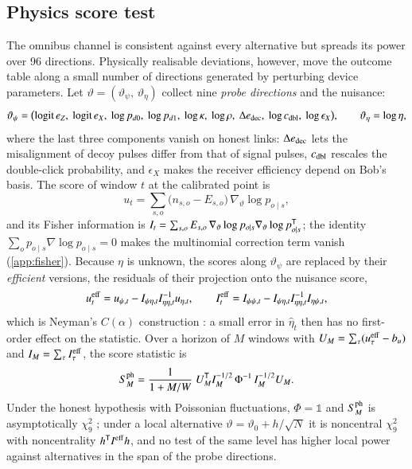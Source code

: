 \subsection{Physics score test}\label{sec:score}

The omnibus channel is consistent against every alternative but spreads its power over 96 directions. Physically realisable deviations, however, move the outcome table along a small number of directions generated by perturbing device parameters. Let $\vartheta=(\vartheta_\psi,\,\vartheta_\eta)$ collect nine \emph{probe directions} and the nuisance:
\begin{equation}
\vartheta_\psi = \bigl(\mathrm{logit}\,e_Z,\ \mathrm{logit}\,e_X,\ \log p_{d0},\ \log p_{d1},\ \log\kappa,\ \log\rho,\ \Delta e_{\rm dec},\ \log c_{\rm dbl},\ \log\epsilon_X\bigr),\qquad \vartheta_\eta=\log\eta, \label{eq:directions}
\end{equation}
where the last three components vanish on honest links: $\Delta e_{\rm dec}$ lets the misalignment of decoy pulses differ from that of signal pulses, $c_{\rm dbl}$ rescales the double-click probability, and $\epsilon_X$ makes the receiver efficiency depend on Bob's basis. The score of window $t$ at the calibrated point is
\begin{equation}
u_t=\sum_{s,o}\bigl(n_{s,o}-E_{s,o}\bigr)\,\nabla_\vartheta\log p_{o\mid s}, \label{eq:score}
\end{equation}
and its Fisher information is $I_t=\sum_{s,o}E_{s,o}\,\nabla_\vartheta\log p_{o\mid s}\nabla_\vartheta\log p_{o\mid s}^{\mathsf{T}}$; the identity $\sum_o p_{o\mid s}\nabla\log p_{o\mid s}=0$ makes the multinomial correction term vanish (\cref{app:fisher}). Because $\eta$ is unknown, the scores along $\vartheta_\psi$ are replaced by their \emph{efficient} versions, the residuals of their projection onto the nuisance score,
\begin{equation}
u^{\rm eff}_t = u_{\psi,t} - I_{\psi\eta,t}I_{\eta\eta,t}^{-1}u_{\eta,t},\qquad
I^{\rm eff}_t = I_{\psi\psi,t} - I_{\psi\eta,t}I_{\eta\eta,t}^{-1}I_{\eta\psi,t}, \label{eq:effscore}
\end{equation}
which is Neyman's $C(\alpha)$ construction \cite{Neyman1959}: a small error in $\hat\eta_t$ then has no first-order effect on the statistic. Over a horizon of $M$ windows with $U_M=\sum_\tau(u^{\rm eff}_\tau-b_u)$ and $I_M=\sum_\tau I^{\rm eff}_\tau$, the score statistic is
\begin{equation}
S^{\rm ph}_M = \frac{1}{1+M/W}\;U_M^{\mathsf{T}} I_M^{-1/2}\,\Phi^{-1}\,I_M^{-1/2}U_M. \label{eq:scorestat}
\end{equation}
Under the honest hypothesis with Poissonian fluctuations, $\Phi=\mathbb{1}$ and $S^{\rm ph}_M$ is asymptotically $\chi^2_9$ \cite{Rao1948,LehmannRomano2005}; under a local alternative $\vartheta=\vartheta_0+h/\sqrt{N}$ it is noncentral $\chi^2_9$ with noncentrality $h^{\mathsf{T}} I^{\rm eff}h$, and no test of the same level has higher local power against alternatives in the span of the probe directions.

